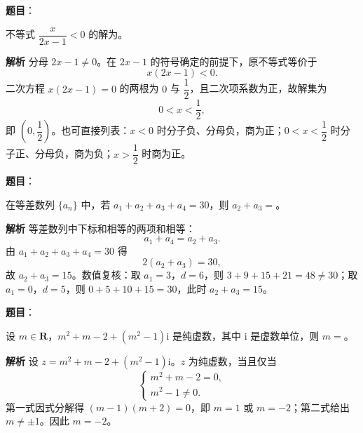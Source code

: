 

\begin{answer}

\textbf{题目}：

不等式 $\dfrac{x}{2x-1}<0$ 的解为\gkblank{}。

\textbf{解析}
分母 $2x-1\neq0$。在 $2x-1$ 的符号确定的前提下，原不等式等价于
\nopagebreak[4]
\[x(2x-1)<0.\]
二次方程 $x(2x-1)=0$ 的两根为 $0$ 与 $\dfrac12$，且二次项系数为正，故解集为
\nopagebreak[4]
\[0<x<\frac12,\]
即 $\left(0,\dfrac12\right)$。也可直接列表：$x<0$ 时分子负、分母负，商为正；$0<x<\dfrac12$ 时分子正、分母负，商为负；$x>\dfrac12$ 时商为正。


\end{answer}
\begin{answer}

\textbf{题目}：

在等差数列 $\{a_n\}$ 中，若 $a_1+a_2+a_3+a_4=30$，则 $a_2+a_3=$\gkblank{}。

\textbf{解析}
等差数列中下标和相等的两项和相等：
\nopagebreak[4]
\[a_1+a_4=a_2+a_3.\]
由 $a_1+a_2+a_3+a_4=30$ 得
\nopagebreak[4]
\[2(a_2+a_3)=30,\]
故 $a_2+a_3=15$。数值复核：取 $a_1=3$，$d=6$，则 $3+9+15+21=48\neq30$；取 $a_1=0$，$d=5$，则 $0+5+10+15=30$，此时 $a_2+a_3=15$。


\end{answer}
\begin{answer}

\textbf{题目}：

设 $m\in\mathbf R$，$m^2+m-2+(m^2-1)\mathrm i$ 是纯虚数，其中 $\mathrm i$ 是虚数单位，则 $m=$\gkblank{}。

\textbf{解析}
设 $z=m^2+m-2+(m^2-1)\mathrm i$。$z$ 为纯虚数，当且仅当
\nopagebreak[4]
\[\begin{cases}
m^2+m-2=0,\\
m^2-1\neq0.
\end{cases}\]
第一式因式分解得 $(m-1)(m+2)=0$，即 $m=1$ 或 $m=-2$；第二式给出 $m\neq\pm1$。因此 $m=-2$。


\end{answer}
